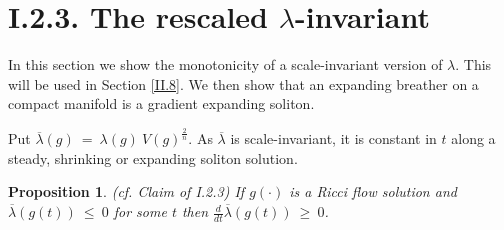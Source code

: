 \documentclass[12pt]{amsart}
\numberwithin{equation}{section}
\theoremstyle{plain}
\newtheorem{proposition}[equation]{Proposition}
\theoremstyle{definition}
\theoremstyle{remark}
\begin{document}
\section{I.2.3. The rescaled $\lambda$-invariant}

In this section we show the monotonicity of a scale-invariant
version of $\lambda$.  This will be used in Section \ref{II.8}.
We then show that an expanding breather on a compact manifold
is a gradient expanding soliton.

Put $\overline{\lambda}(g) \: = \: \lambda(g) \: V(g)^{\frac{2}{n}}$.
As $\overline{\lambda}$ is scale-invariant, it is constant in $t$
along a steady, shrinking or expanding soliton solution.

\begin{proposition} \label{expandingprop}  (cf. Claim of I.2.3)
If $g(\cdot)$ is a Ricci flow solution and 
$\overline{\lambda}(g(t)) \: \le \: 0$ for some $t$ then
$\frac{d}{dt} \overline{\lambda}(g(t)) \: \ge \: 0$.
\end{proposition}
\end{document}
